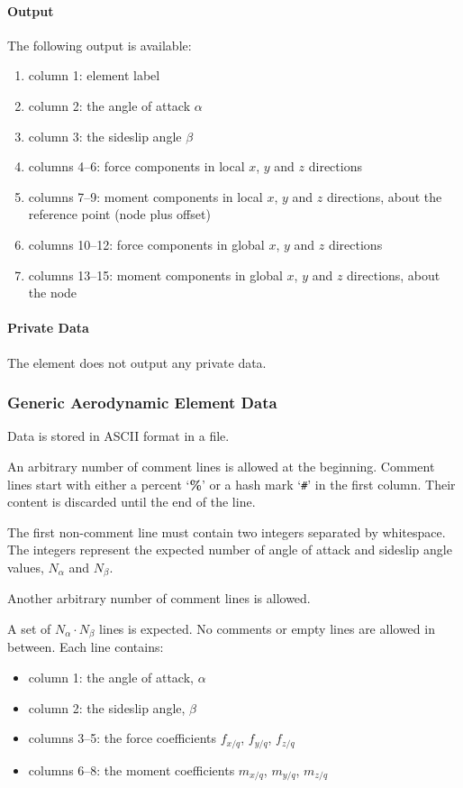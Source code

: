 \paragraph{Output}
The following output is available:
\begin{enumerate}
\item column 1: element label
\item column 2: the angle of attack $\alpha$
\item column 3: the sideslip angle $\beta$
\item columns 4--6: force components in local $x$, $y$ and $z$ directions
\item columns 7--9: moment components in local $x$, $y$ and $z$ directions,
	about the reference point (node plus offset)
\item columns 10--12: force components in global $x$, $y$ and $z$ directions
\item columns 13--15: moment components in global $x$, $y$ and $z$ directions,
	about the node
\end{enumerate}

\paragraph{Private Data}
The  element does not output any private data.

\subsubsection{Generic Aerodynamic Element Data}
Data is stored in ASCII format in a file.

An arbitrary number of comment lines is allowed at the beginning.
Comment lines start with either a percent `\textbf{\%}'
or a hash mark `\texttt{\#}' in the first column.
Their content is discarded until the end of the line.

The first non-comment line must contain two integers separated by whitespace.
The integers represent the expected number of angle of attack
and sideslip angle values, $N_\alpha$ and $N_\beta$.

Another arbitrary number of comment lines is allowed.

A set of $N_\alpha \cdot N_\beta$ lines is expected.
No comments or empty lines are allowed in between.
Each line contains:
\begin{itemize}
\item column 1: the angle of attack, $\alpha$
\item column 2: the sideslip angle, $\beta$
\item columns 3--5: the force coefficients $f_{x/q}$, $f_{y/q}$, $f_{z/q}$
\item columns 6--8: the moment coefficients $m_{x/q}$, $m_{y/q}$, $m_{z/q}$
\end{itemize}

